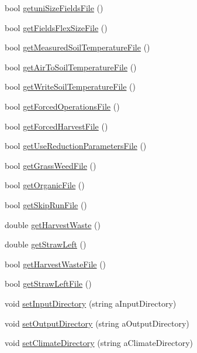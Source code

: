 \begin{DoxyCompactItemize}
bool \hyperlink{classsystem_run_data_a5fed76f48685a7b22f0a0191c10a7317}{getuniSizeFieldsFile} ()
\item 
bool \hyperlink{classsystem_run_data_a80bfbbda36755b0ebcce631cd8202f32}{getFieldsFlexSizeFile} ()
\item 
bool \hyperlink{classsystem_run_data_a502b4c19935abb0c98b72932e1878ca4}{getMeasuredSoilTemperatureFile} ()
\item 
bool \hyperlink{classsystem_run_data_a93d2bfdf67eabefa4dc1dfa89e4f2f59}{getAirToSoilTemperatureFile} ()
\item 
bool \hyperlink{classsystem_run_data_ac2045bdaf6c3c39051dc78a1f0ca08af}{getWriteSoilTemperatureFile} ()
\item 
bool \hyperlink{classsystem_run_data_a34208adf19aac181ba2cde68b8440734}{getForcedOperationsFile} ()
\item 
bool \hyperlink{classsystem_run_data_aa306f3d79df9f02fc9e4266c513d1f26}{getForcedHarvestFile} ()
\item 
bool \hyperlink{classsystem_run_data_a24fc6d309cb597e4d3cbf768a71675b9}{getUseReductionParametersFile} ()
\item 
bool \hyperlink{classsystem_run_data_ad57c722112099cfb0707026f6d0d7a4d}{getGrassWeedFile} ()
\item 
bool \hyperlink{classsystem_run_data_a41ab1ee16ce7461864e57135ad2587d3}{getOrganicFile} ()
\item 
bool \hyperlink{classsystem_run_data_af27ac3646ce8e9332fa25aacb668ff3c}{getSkipRunFile} ()
\item 
double \hyperlink{classsystem_run_data_a8f224e890ddfe3d25068842c5b8abdf0}{getHarvestWaste} ()
\item 
double \hyperlink{classsystem_run_data_ac072c1cc4a6532516a7a9d6440cc6a0b}{getStrawLeft} ()
\item 
bool \hyperlink{classsystem_run_data_ab37a5a766f79944fdd52c22aa917c41d}{getHarvestWasteFile} ()
\item 
bool \hyperlink{classsystem_run_data_a8e73d17b8abe244546d9f1a8dd392859}{getStrawLeftFile} ()
\item 
void \hyperlink{classsystem_run_data_a6cd0640a7b35d97e5aa55dff06e73657}{setInputDirectory} (string aInputDirectory)
\item 
void \hyperlink{classsystem_run_data_ac8e56338e653414b63caa5c89dacfa63}{setOutputDirectory} (string aOutputDirectory)
\item 
void \hyperlink{classsystem_run_data_af7e93d6c11b076c99119797eb4559d3e}{setClimateDirectory} (string aClimateDirectory)

\end{DoxyCompactItemize}
